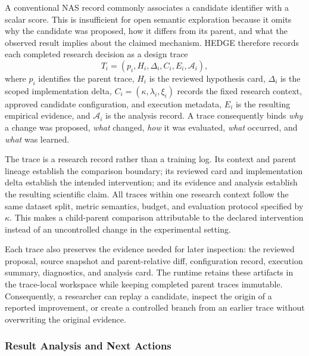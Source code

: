A conventional NAS record commonly associates a candidate identifier with a scalar score. This is insufficient for open semantic exploration because it omits why the candidate was proposed, how it differs from its parent, and what the observed result implies about the claimed mechanism. HEDGE therefore records each completed research decision as a design trace
\begin{equation}
    T_i=(p_i,H_i,\Delta_i,C_i,E_i,\mathcal{A}_i),
    \label{eq:design_trace}
\end{equation}
where $p_i$ identifies the parent trace, $H_i$ is the reviewed hypothesis card, $\Delta_i$ is the scoped implementation delta, $C_i=(\kappa,\lambda_i,\xi_i)$ records the fixed research context, approved candidate configuration, and execution metadata, $E_i$ is the resulting empirical evidence, and $\mathcal{A}_i$ is the analysis record. A trace consequently binds \emph{why} a change was proposed, \emph{what} changed, \emph{how} it was evaluated, \emph{what} occurred, and \emph{what} was learned.

The trace is a research record rather than a training log. Its context and parent lineage establish the comparison boundary; its reviewed card and implementation delta establish the intended intervention; and its evidence and analysis establish the resulting scientific claim. All traces within one research context follow the same dataset split, metric semantics, budget, and evaluation protocol specified by $\kappa$. This makes a child-parent comparison attributable to the declared intervention instead of an uncontrolled change in the experimental setting.

Each trace also preserves the evidence needed for later inspection: the reviewed proposal, source snapshot and parent-relative diff, configuration record, execution summary, diagnostics, and analysis card. The runtime retains these artifacts in the trace-local workspace while keeping completed parent traces immutable. Consequently, a researcher can replay a candidate, inspect the origin of a reported improvement, or create a controlled branch from an earlier trace without overwriting the original evidence.

\subsubsection{Result Analysis and Next Actions}

